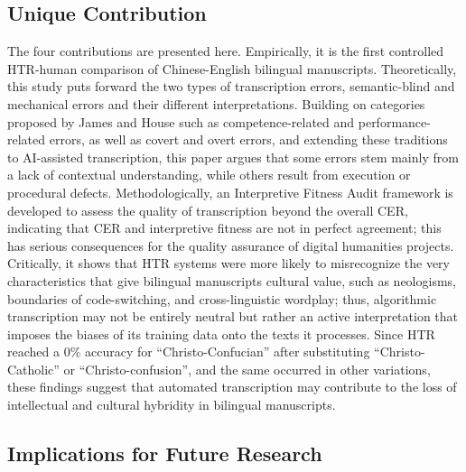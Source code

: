 \documentclass[final]{anthology-ch} %
\begin{document}
\subsection{Unique Contribution}

The four contributions are presented here. Empirically, it is the first controlled HTR-human comparison of Chinese-English bilingual manuscripts. Theoretically, this study puts forward the two types of transcription errors, semantic-blind and mechanical errors and their different interpretations. Building on categories proposed by James \cite{james2013errors} and House \cite{house2015translation} such as competence-related and performance-related errors, as well as covert and overt errors, and extending these traditions to AI-assisted transcription, this paper argues that some errors stem mainly from a lack of contextual understanding, while others result from execution or procedural defects. Methodologically, an Interpretive Fitness Audit framework is developed to assess the quality of transcription beyond the overall CER, indicating that CER and interpretive fitness are not in perfect agreement; this has serious consequences for the quality assurance of digital humanities projects. Critically, it shows that HTR systems were more likely to misrecognize the very characteristics that give bilingual manuscripts cultural value, such as neologisms, boundaries of code-switching, and cross-linguistic wordplay; thus, algorithmic transcription may not be entirely neutral but rather an active interpretation that imposes the biases of its training data onto the texts it processes. Since HTR reached a 0\% accuracy for \enquote{Christo-Confucian} after substituting \enquote{Christo-Catholic} or \enquote{Christo-confusion}, and the same occurred in other variations, these findings suggest that automated transcription may contribute to the loss of intellectual and cultural hybridity in bilingual manuscripts.

\subsection{Implications for Future Research}
\end{document}
